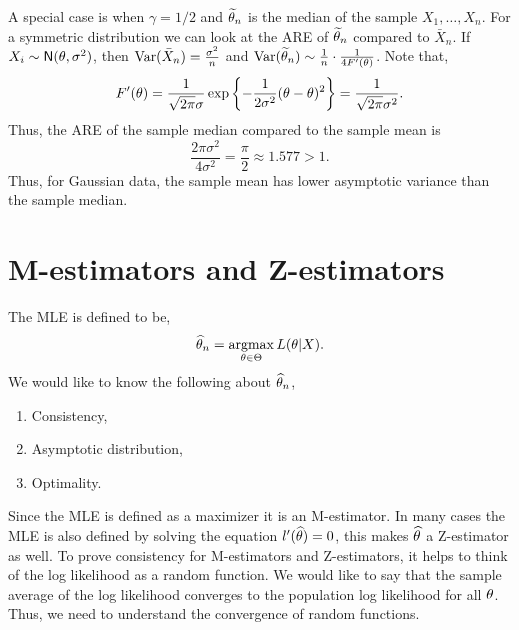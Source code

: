 A special case is when $\gamma = 1/2$ and $\widetilde{{\theta}}_n$ is the median of the sample $X_1,\ldots,X_n$. For a symmetric distribution we can look at the ARE of $\widetilde{{\theta}}_n$ compared to $\bar{X}_n$. If $X_i \sim \mathsf{N}({\theta},\sigma^2)$, then $\operatorname{Var}(\bar{X}_n) = \frac{\sigma^2}{n}$ and $\operatorname{Var}(\widetilde{{\theta}}_n) \sim \frac{1}{n}\cdot \frac{1}{4F'({\theta})}$. Note that,
\[F'({\theta}) = \frac{1}{\sqrt{2\pi} \sigma}\exp\left\{-\frac{1}{2\sigma^2}({\theta}-{\theta})^2\right\} = \frac{1}{\sqrt{2\pi}\sigma^2}.\]
Thus, the ARE of the sample median compared to the sample mean is 
\[\frac{2\pi \sigma^2}{4\sigma^2} = \frac{\pi}{2} \approx 1.577 >1. \]
Thus, for Gaussian data, the sample mean has lower asymptotic variance than the sample median. 

\section{M-estimators and Z-estimators}
The MLE is defined to be,
\[\widehat{{\theta}}_n =  \operatorname*{argmax}_{{\theta} \in {\Theta}} L({\theta}|X). \]
We would like to know the following about $\widehat{{\theta}}_n$,
\begin{enumerate}
    \item Consistency,
    \item Asymptotic distribution,
    \item Optimality.
\end{enumerate}
Since the MLE is defined as a maximizer it is an M-estimator. In many cases the MLE is also defined by solving the equation $l'(\widehat{{\theta}})=0$, this makes $\widehat{{\theta}}$ a Z-estimator as well. To prove consistency for M-estimators and Z-estimators, it helps to think of the log likelihood as a random function. We would like to say that the sample average of the log likelihood converges to the population log likelihood for all ${\theta}$. Thus, we need to understand the convergence of random functions.
